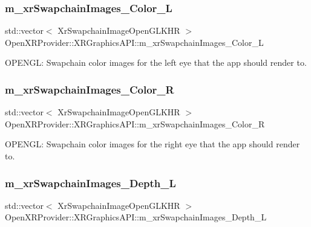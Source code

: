 \subsubsection{\texorpdfstring{m\_xrSwapchainImages\_Color\_L}{m\_xrSwapchainImages\_Color\_L}}
{\footnotesize\ttfamily std\+::vector$<$ Xr\+Swapchain\+Image\+Open\+G\+L\+K\+HR $>$ Open\+X\+R\+Provider\+::\+X\+R\+Graphics\+A\+P\+I\+::m\+\_\+xr\+Swapchain\+Images\+\_\+\+Color\+\_\+L\hspace{0.3cm}{\ttfamily [private]}}



O\+P\+E\+N\+GL\+: Swapchain color images for the left eye that the app should render to. 

\mbox{\label{class_open_x_r_provider_1_1_x_r_graphics_a_p_i_a34305192c60366d37790cca77d1dbcc9}} 
\subsubsection{\texorpdfstring{m\_xrSwapchainImages\_Color\_R}{m\_xrSwapchainImages\_Color\_R}}
{\footnotesize\ttfamily std\+::vector$<$ Xr\+Swapchain\+Image\+Open\+G\+L\+K\+HR $>$ Open\+X\+R\+Provider\+::\+X\+R\+Graphics\+A\+P\+I\+::m\+\_\+xr\+Swapchain\+Images\+\_\+\+Color\+\_\+R\hspace{0.3cm}{\ttfamily [private]}}



O\+P\+E\+N\+GL\+: Swapchain color images for the right eye that the app should render to. 

\mbox{\label{class_open_x_r_provider_1_1_x_r_graphics_a_p_i_a9a05367721766121eec6e528cb325e7a}} 
\subsubsection{\texorpdfstring{m\_xrSwapchainImages\_Depth\_L}{m\_xrSwapchainImages\_Depth\_L}}
{\footnotesize\ttfamily std\+::vector$<$ Xr\+Swapchain\+Image\+Open\+G\+L\+K\+HR $>$ Open\+X\+R\+Provider\+::\+X\+R\+Graphics\+A\+P\+I\+::m\+\_\+xr\+Swapchain\+Images\+\_\+\+Depth\+\_\+L\hspace{0.3cm}{\ttfamily [private]}}



